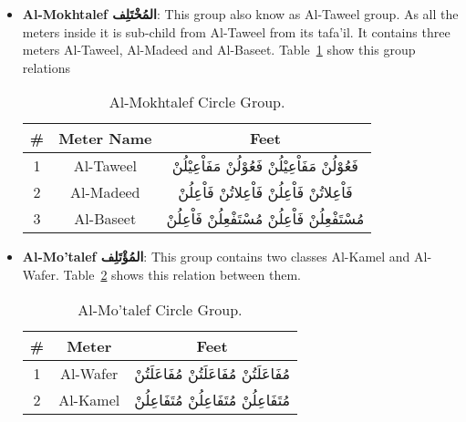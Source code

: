   
  \begin{itemize}
  \item \textbf{Al-Mokhtalef \textarabic{المُخْتَلِف}}: This group also know as Al-Taweel group. As all the meters inside it is sub-child from Al-Taweel from its tafa'il. It contains three meters Al-Taweel, Al-Madeed and Al-Baseet. Table~\ref{tab:AlMokhtalef_Group} show this group relations

\begin{table}[!ht]
  \centering
  \begin{tabular}{ c c c}
    \hline
    \textbf{\#} & \textbf{Meter Name}  & \textbf{Feet} \\
    \hline
    1 & \textarabic{Al-Taweel} & \textarabic{فَعُوْلُنْ مَفَاْعِيْلُنْ فَعُوْلُنْ مَفَاْعِيْلُنْ}\\
    2 &\textarabic{Al-Madeed}&  \textarabic{فَاْعِلاتُنْ فَاْعِلُنْ فَاْعِلاتُنْ فَاْعِلُنْ}\\
    3 &\textarabic{Al-Baseet}  & \textarabic{مُسْتَفْعِلُنْ فَاْعِلُنْ مُسْتَفْعِلُنْ فَاْعِلُنْ}\\
    \hline                                                
  \end{tabular}
\caption{Al-Mokhtalef Circle Group.}\label{tab:AlMokhtalef_Group}
\end{table}
    


\item \textbf{Al-Mo'talef \textarabic{المُؤْتَلِف}}: This group contains two classes Al-Kamel and Al-Wafer. Table~\ref{tab:Al-Mo'talef_Group} shows this relation between them.

\begin{table}[!h]
  \centering
  \begin{tabular}{c c c}
    \hline
    \textbf{\#} & \textbf{Meter}  & \textbf{Feet} \\
    \hline
    1 & \textarabic{Al-Wafer} & \textarabic{مُفَاعَلَتُنْ مُفَاعَلَتُنْ مُفَاعَلَتُنْ}\\
    2 &\textarabic{Al-Kamel}&  \textarabic{مُتَفَاعِلُنْ مُتَفَاعِلُنْ مُتَفَاعِلُنْ}\\
    \hline                                                
  \end{tabular}
\caption{Al-Mo'talef Circle Group.}\label{tab:Al-Mo'talef_Group}
\end{table}
  

\end{itemize}
